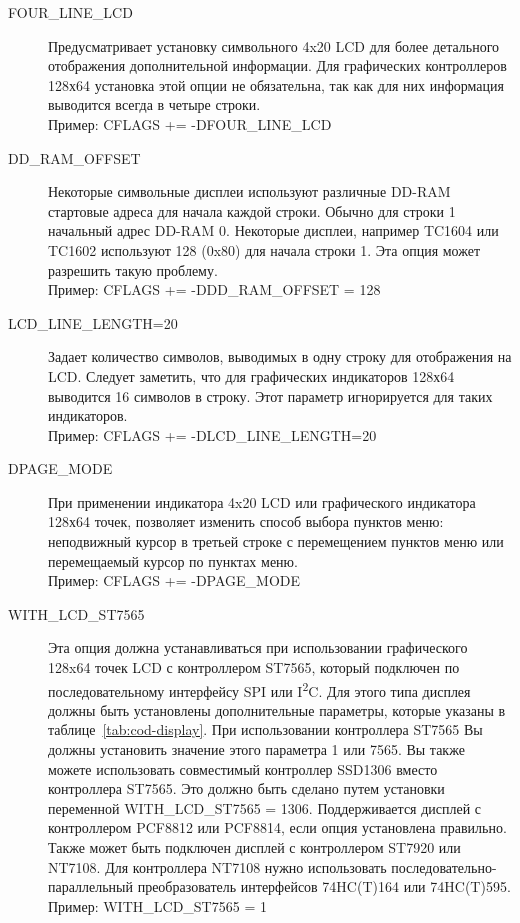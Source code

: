 \begin{description}
  \item[FOUR\_LINE\_LCD] Предусматривает установку символьного 4x20 LCD для более детального отображения 
дополнительной информации. Для графических контроллеров 128х64 установка этой опции не обязательна, так как
для них информация выводится всегда в четыре строки.\\
Пример: CFLAGS += -DFOUR\_LINE\_LCD

  \item[DD\_RAM\_OFFSET] Некоторые символьные дисплеи используют различные DD-RAM стартовые адреса для начала каждой строки.
Обычно для строки 1 начальный адрес DD-RAM 0.
Некоторые дисплеи, например TC1604 или TC1602 используют 128 (0x80) для начала строки 1.
Эта опция может разрешить такую проблему. \\
Пример: CFLAGS += -DDD\_RAM\_OFFSET = 128

  \item[LCD\_LINE\_LENGTH=20] Задает количество символов, выводимых в одну строку для отображения на LCD.
Следует заметить, что для графических индикаторов 128х64 выводится 16 символов в строку. 
Этот параметр игнорируется для таких индикаторов. \\
Пример: CFLAGS += -DLCD\_LINE\_LENGTH=20

  \item[DPAGE\_MODE] При применении индикатора 4x20 LCD или графического индикатора 128х64 точек, позволяет 
изменить способ выбора пунктов меню: неподвижный курсор в третьей строке с перемещением пунктов меню или 
перемещаемый курсор по пунктах меню. \\
Пример: CFLAGS += -DPAGE\_MODE
 
  \item[WITH\_LCD\_ST7565] Эта опция должна устанавливаться при использовании графического 128x64 точек LCD с 
контроллером ST7565, который подключен по последовательному интерфейсу SPI или I\textsuperscript{2}C. Для этого типа дисплея должны быть 
установлены дополнительные параметры, которые указаны в таблице~\ref{tab:cod-display}.
При использовании контроллера ST7565 Вы должны установить значение этого параметра 1 или 7565. 
Вы также можете использовать совместимый контроллер SSD1306 вместо контроллера ST7565.
Это должно быть сделано путем установки переменной WITH\_LCD\_ST7565 = 1306.
Поддерживается дисплей с контроллером PCF8812 или PCF8814, если опция установлена правильно.
Также может быть подключен дисплей с контроллером ST7920 или NT7108.
Для контроллера NT7108 нужно использовать последовательно-параллельный преобразователь интерфейсов 
74HC(T)164 или 74HC(T)595. \\
Пример: WITH\_LCD\_ST7565 = 1


\end{description}
